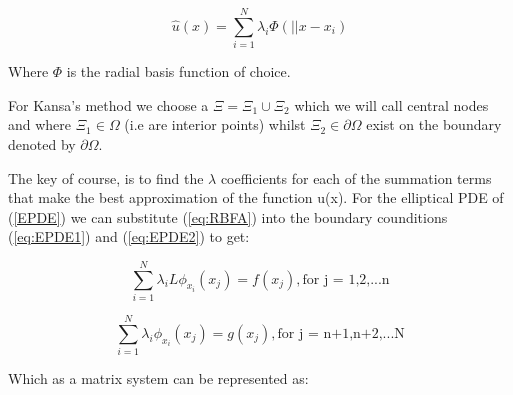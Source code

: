 \documentclass[a4paper]{amsart}
\begin{document}
\begin{equation} \label{eq:RBFA}
\hat u(x) = \sum^{N}_{i=1} \lambda_{i} \Phi(||x - x_{i})
\end{equation}

Where $\Phi$ is the radial basis function of choice.

For Kansa's method we choose a $\Xi = \Xi_{1} \cup \Xi_{2}$ which we will call central nodes and where $\Xi_{1} \in \Omega$ (i.e are interior points) whilst  $\Xi_{2} \in \partial \Omega$ exist on the boundary denoted by $\partial \Omega$.

The key of course, is to find the $\lambda$ coefficients for each of the summation terms that make the best approximation of the function u(x). For the elliptical PDE of (\ref{EPDE}) we can substitute (\ref{eq:RBFA}) into the boundary counditions (\ref{eq:EPDE1}) and (\ref{eq:EPDE2}) to get:

\begin{equation} \label{eq:Kansa1}
\sum_{i=1}^{N} \lambda_{i} L \phi_{x_{i}}(x_{j}) = f(x_{j}),\mbox{for j = 1,2,...n}
\end{equation}

\begin{equation} \label{eq:Kansa2}
\sum_{i=1}^{N} \lambda_{i} \phi_{x_{i}}(x_{j}) = g(x_{j}),\mbox{for j = n+1,n+2,...N}
\end{equation}

Which as a matrix system can be represented as:
\end{document}
